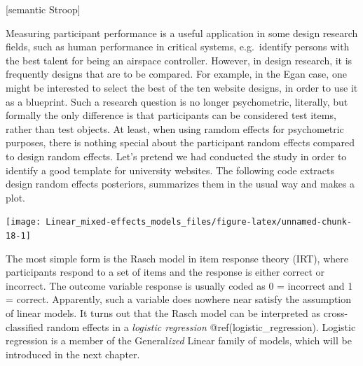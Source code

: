 \documentclass[]{svmono}
\newenvironment{Shaded}{\begin{snugshade}}{\end{snugshade}}
\newcommand{\KeywordTok}[1]{\textcolor[rgb]{0.13,0.29,0.53}{\textbf{#1}}}
\newcommand{\DataTypeTok}[1]{\textcolor[rgb]{0.13,0.29,0.53}{#1}}
\newcommand{\DecValTok}[1]{\textcolor[rgb]{0.00,0.00,0.81}{#1}}
\newcommand{\StringTok}[1]{\textcolor[rgb]{0.31,0.60,0.02}{#1}}
\newcommand{\OperatorTok}[1]{\textcolor[rgb]{0.81,0.36,0.00}{\textbf{#1}}}
\newcommand{\NormalTok}[1]{#1}
\begin{document}
{[}semantic Stroop{]}

Measuring participant performance is a useful application in some design
research fields, such as human performance in critical systems,
e.g.~identify persons with the best talent for being an airspace
controller. However, in design research, it is frequently designs that
are to be compared. For example, in the Egan case, one might be
interested to select the best of the ten website designs, in order to
use it as a blueprint. Such a research question is no longer
psychometric, literally, but formally the only difference is that
participants can be considered test items, rather than test objects. At
least, when using ramdom effects for psychometric purposes, there is
nothing special about the participant random effects compared to design
random effects. Let's pretend we had conducted the study in order to
identify a good template for university websites. The following code
extracts design random effects posteriors, summarizes them in the usual
way and makes a plot.

\begin{Shaded}
\end{Shaded}

\texttt{[image: Linear\_mixed-effects\_models\_files/figure-latex/unnamed-chunk-18-1]}

The most simple form is the Rasch model in item response theory (IRT),
where participants respond to a set of items and the response is either
correct or incorrect. The outcome variable response is usually coded as
0 = incorrect and 1 = correct. Apparently, such a variable does nowhere
near satisfy the assumption of linear models. It turns out that the
Rasch model can be interpreted as cross-classified random effects in a
\emph{logistic regression} @ref(logistic\_regression). Logistic
regression is a member of the General\emph{ized} Linear family of
models, which will be introduced in the next chapter.
\end{document}
